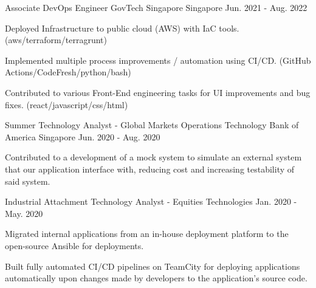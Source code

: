 \begin{cventries}
  \cventry
    {Associate DevOps Engineer} %
    {GovTech Singapore} %
    {Singapore} %
    {Jun. 2021 - Aug. 2022} %
    {
      \begin{cvitems} %
        \item {Deployed Infrastructure to public cloud (AWS) with IaC tools. (aws/terraform/terragrunt)}
        \item {Implemented multiple process improvements / automation using CI/CD. (GitHub Actions/CodeFresh/python/bash)}
        \item {Contributed to various Front-End engineering tasks for UI improvements and bug fixes. (react/javascript/css/html)}
      \end{cvitems}
    }

  \cventry
    {Summer Technology Analyst - Global Markets Operations Technology} %
    {Bank of America} %
    {Singapore} %
    {Jun. 2020 - Aug. 2020} %
    {
      \begin{cvitems} %
        \item {Contributed to a development of a mock system to simulate an external system that our application interface with, reducing cost and increasing testability of said system.}
      \end{cvitems}
    }

  \cventry
    {Industrial Attachment Technology Analyst - Equities Technologies} %
    {} %
    {} %
    {Jan. 2020 - May. 2020} %
    {
      \begin{cvitems} %
        \item {Migrated internal applications from an in-house deployment platform to the open-source Ansible for deployments.}
        \item {Built fully automated CI/CD pipelines on TeamCity for deploying applications automatically upon changes made by developers to the application's source code.}
      \end{cvitems}
    }




\end{cventries}
